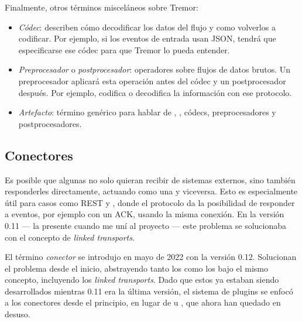 Finalmente, otros términos misceláneos sobre Tremor:

\begin{itemize}
    \item \emph{Códec}: describen cómo decodificar los datos del flujo y como
        volverlos a codificar. Por ejemplo, si los eventos de entrada usan JSON,
        tendrá que especificarse ese códec para que Tremor lo pueda entender.

    \item \emph{Preprocesador} o \emph{postprocesador}: operadores sobre flujos
        de datos brutos. Un preprocesador aplicará esta operación antes del
        códec y un postprocesador después. Por ejemplo,  codifica o
        decodifica la información con ese protocolo.

    \item \emph{Artefacto}: término genérico para hablar de \sinks, \sources,
        códecs, preprocesadores y postprocesadores.

\end{itemize}

\subsection{Conectores}

Es posible que algunas \onramps no solo quieran recibir de sistemas externos,
sino también responderles directamente, actuando como una \offramp y viceversa.
Esto es especialmente útil para casos como REST y \websockets, donde el
protocolo da la posibilidad de responder a eventos, por ejemplo con un ACK,
usando la misma conexión. En la versión 0.11 --- la presente cuando me uní al
proyecto --- este problema se solucionaba con el concepto de \emph{linked
transports}.

El término \emph{conector} se introdujo en mayo de 2022 con la versión 0.12.
Solucionan el problema desde el inicio, abstrayendo tanto los \onramps como los
\offramps bajo el mismo concepto, incluyendo los \emph{linked transports}. Dado
que estos ya estaban siendo desarrollados mientras 0.11 era la última versión,
el sistema de plugins se enfocó a los conectores desde el principio, en lugar de
\onramps u \offramps, que ahora han quedado en desuso.
